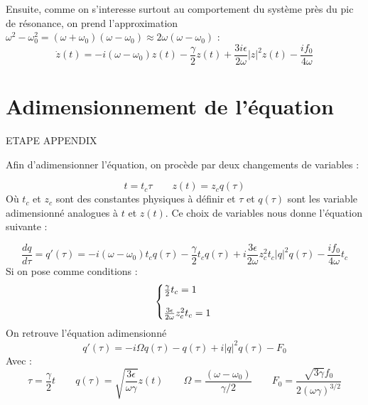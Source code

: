 Ensuite, comme on s'interesse surtout au comportement du système près du pic de résonance, 
on prend l'approximation $\omega^2 - \omega_0^2 = (\omega + \omega_0)(\omega - \omega_0) \approx 2\omega(\omega - \omega_0)$ :
\begin{dmath}
    \dot{z}(t) = -i(\omega - \omega_0)z(t)
    - \frac{\gamma}{2} z(t) + \frac{3i\epsilon}{2\omega}|z|^2z(t) - \frac{if_0}{4\omega}
\end{dmath}


\section{Adimensionnement de l'équation}

ETAPE APPENDIX

Afin d'adimensionner l'équation, on procède par deux changements de variables :

\begin{equation}
    t = t_c \tau
    \qquad 
    z(t) = z_c q(\tau)
\end{equation}
Où $t_c$ et $z_c$ sont des constantes physiques à définir et $\tau$ et $q(\tau)$ sont les variable adimensionné analogues à $t$ et $z(t)$.
Ce choix de variables nous donne l'équation suivante :

\begin{equation}
    \frac{dq}{d\tau} = q'(\tau) = -i(\omega - \omega_0)t_c q(\tau) - \frac{\gamma}{2}t_c q(\tau) + i \frac{3\epsilon}{2\omega}z_c^2t_c |q|^2q(\tau) - \frac{if_0}{4\omega}t_c
\end{equation}
Si on pose comme conditions :
\begin{equation}
    \left\{
    \begin{array}{@{}l@{}}
        \frac{\gamma}{2}t_c = 1 \\
        \\
        \frac{3\epsilon}{2\omega}z_c^2t_c = 1
    \end{array}
    \right.\,
\end{equation}
On retrouve l'équation adimensionné
\begin{equation}
    q'(\tau) = -i\Omega q(\tau) - q(\tau) + i|q|^2q(\tau) - F_0
\end{equation}
Avec :
\begin{equation}
    \tau = \frac{\gamma}{2}t
    \qquad
    q(\tau) = \sqrt{\frac{3\epsilon}{\omega\gamma}}z(t)
    \qquad
    \Omega = \frac{(\omega - \omega_0)}{\gamma/2}
    \qquad
    F_0 = \frac{\sqrt{3\gamma}f_0}{2(\omega \gamma)^{3/2}}
\end{equation}

